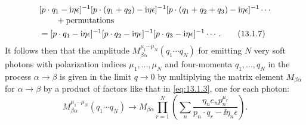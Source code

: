 

\begin{align}
 &[p\cdot q_1-\mathrm{i}\eta\epsilon]^{-1}
 [p\cdot(q_1+q_2)-\mathrm{i}\eta\epsilon]^{-1}
 [p\cdot(q_1+q_2+q_3)-\mathrm{i}\eta\epsilon]^{-1}\cdots
 \notag\\[-2pt]
 &\qquad{}+\text{permutations}
 \notag\\
 &=[p\cdot q_1-\mathrm{i}\eta\epsilon]^{-1}
 [p\cdot q_2-\mathrm{i}\eta\epsilon]^{-1}
 [p\cdot q_3-\mathrm{i}\eta\epsilon]^{-1}\cdots.
 \tag{13.1.7}\label{eq:13.1.7}
\end{align}
It follows then that the amplitude $M^{\mu_1\cdots\mu_N}_{\beta\alpha}(q_1\cdots q_N)$ for emitting $N$
very soft photons with polarization indices $\mu_1,\ldots,\mu_N$ and four-momenta
$q_1,\ldots,q_N$ in the process $\alpha\to\beta$ is given in the limit $q\to0$ by multiplying
the matrix element $M_{\beta\alpha}$ for $\alpha\to\beta$ by a product of factors like that in
\eqref{eq:13.1.3}, one for each photon:
\begin{equation}
  M^{\mu_1\cdots\mu_N}_{\beta\alpha}(q_1\cdots q_N)\longrightarrow
  M_{\beta\alpha}\prod_{r=1}^{N}
  \left(\sum_n\frac{\eta_n e_n p_n^{\mu_r}}{p_n\cdot q_r-\ii\eta_n\epsilon}\right).
  \tag{13.1.8}\label{eq:13.1.8}
\end{equation}
